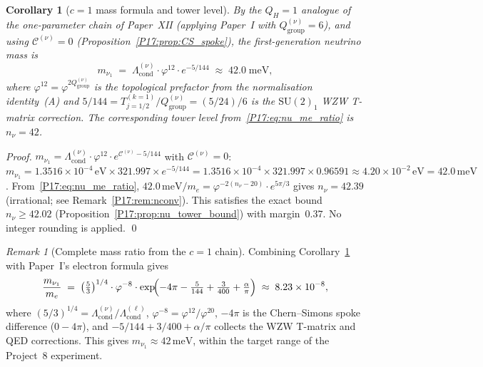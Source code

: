 \documentclass[11pt,a4paper]{article}
\newtheorem{corollary}[theorem]{Corollary}
\theoremstyle{definition}\newtheorem{definition}[theorem]{Definition}
\theoremstyle{remark}
\newtheorem{remark}[theorem]{Remark}
\newcommand{\vp}{\varphi}
\newcommand{\Lcond}{\Lambda_{\mathrm{cond}}}
\newcommand{\SU}{\mathrm{SU}}
\newcommand{\QH}{Q_H}
\begin{document}
\begin{corollary}[$c=1$ mass formula and tower level]
\label{P17:cor:qh1_mass}
By the $\QH=1$ analogue of the one-parameter chain of Paper~XII
(applying Paper~I with $Q_{\mathrm{group}}^{(\nu)}=6$), and using
$\mathcal{C}^{(\nu)}=0$ (Proposition~\ref{P17:prop:CS_spoke}), the
first-generation neutrino mass is
\begin{equation}
  \boxed{m_{\nu_1}
  \;=\; \Lcond^{(\nu)}\cdot\vp^{12}\cdot e^{-5/144}
  \;\approx\; 42.0\;\mathrm{meV},}
  \label{P17:eq:mnu1_final}
\end{equation}
where $\vp^{12}=\vp^{2Q_{\mathrm{group}}^{(\nu)}}$ is the topological
prefactor from the normalisation identity~\textup{(A)} and
$5/144=T_{j=1/2}^{(k=1)}/Q_{\mathrm{group}}^{(\nu)}=(5/24)/6$ is the
$\SU(2)_1$ WZW T-matrix correction.  The corresponding tower level
from~\eqref{P17:eq:nu_me_ratio} is $n_\nu=42$.
\end{corollary}

\begin{proof}
$m_{\nu_1}=\Lcond^{(\nu)}\cdot\vp^{12}\cdot e^{\mathcal{C}^{(\nu)}-5/144}$
with $\mathcal{C}^{(\nu)}=0$:
$m_{\nu_1}=1.3516\times10^{-4}\,\mathrm{eV}\times321.997\times e^{-5/144}
=1.3516\times10^{-4}\times321.997\times0.96591
\approx4.20\times10^{-2}\,\mathrm{eV}=42.0\,\mathrm{meV}$.
From~\eqref{P17:eq:nu_me_ratio}, $42.0\,\mathrm{meV}/m_e=\vp^{-2(n_\nu-20)}\cdot
e^{5\pi/3}$ gives $n_\nu=42.39$ (irrational; see Remark~\ref{P17:rem:nconv}).
This satisfies the exact bound $n_\nu\geq42.02$
(Proposition~\ref{P17:prop:nu_tower_bound}) with margin~$0.37$.  No integer
rounding is applied. \qed
\end{proof}

\begin{remark}[Complete mass ratio from the $c=1$ chain]
\label{P17:rem:mnu_me_ratio}
Combining Corollary~\ref{P17:cor:qh1_mass} with Paper~I's electron formula gives
\begin{equation}
  \frac{m_{\nu_1}}{m_e}
  \;=\; \left(\tfrac{5}{3}\right)^{1/4}\cdot\vp^{-8}\cdot
        \exp\!\Bigl(-4\pi-\tfrac{5}{144}+\tfrac{3}{400}+\tfrac{\alpha}{\pi}\Bigr)
  \;\approx\; 8.23\times10^{-8},
  \label{P17:eq:mnu_me_complete}
\end{equation}
where $(5/3)^{1/4}=\Lcond^{(\nu)}/\Lcond^{(\ell)}$, $\vp^{-8}=\vp^{12}/\vp^{20}$,
$-4\pi$ is the Chern--Simons spoke difference ($0-4\pi$), and
$-5/144+3/400+\alpha/\pi$ collects the WZW T-matrix and QED corrections.
This gives $m_{\nu_1}\approx42\,\mathrm{meV}$, within the target range
of the Project~8 experiment.
\end{remark}
\end{document}
